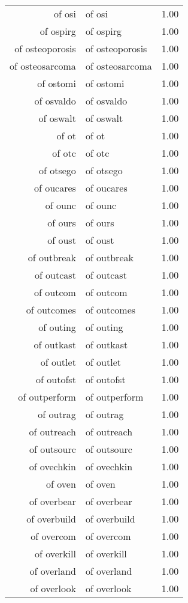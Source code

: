 \begin{table}[ht]
\begin{tabular}{rlr}
  of osi & of osi & 1.00 \\ 
  of ospirg & of ospirg & 1.00 \\ 
  of osteoporosis & of osteoporosis & 1.00 \\ 
  of osteosarcoma & of osteosarcoma & 1.00 \\ 
  of ostomi & of ostomi & 1.00 \\ 
  of osvaldo & of osvaldo & 1.00 \\ 
  of oswalt & of oswalt & 1.00 \\ 
  of ot & of ot & 1.00 \\ 
  of otc & of otc & 1.00 \\ 
  of otsego & of otsego & 1.00 \\ 
  of oucares & of oucares & 1.00 \\ 
  of ounc & of ounc & 1.00 \\ 
  of ours & of ours & 1.00 \\ 
  of oust & of oust & 1.00 \\ 
  of outbreak & of outbreak & 1.00 \\ 
  of outcast & of outcast & 1.00 \\ 
  of outcom & of outcom & 1.00 \\ 
  of outcomes & of outcomes & 1.00 \\ 
  of outing & of outing & 1.00 \\ 
  of outkast & of outkast & 1.00 \\ 
  of outlet & of outlet & 1.00 \\ 
  of outofst & of outofst & 1.00 \\ 
  of outperform & of outperform & 1.00 \\ 
  of outrag & of outrag & 1.00 \\ 
  of outreach & of outreach & 1.00 \\ 
  of outsourc & of outsourc & 1.00 \\ 
  of ovechkin & of ovechkin & 1.00 \\ 
  of oven & of oven & 1.00 \\ 
  of overbear & of overbear & 1.00 \\ 
  of overbuild & of overbuild & 1.00 \\ 
  of overcom & of overcom & 1.00 \\ 
  of overkill & of overkill & 1.00 \\ 
  of overland & of overland & 1.00 \\ 
  of overlook & of overlook & 1.00 \\ 

\end{tabular}
\end{table}
